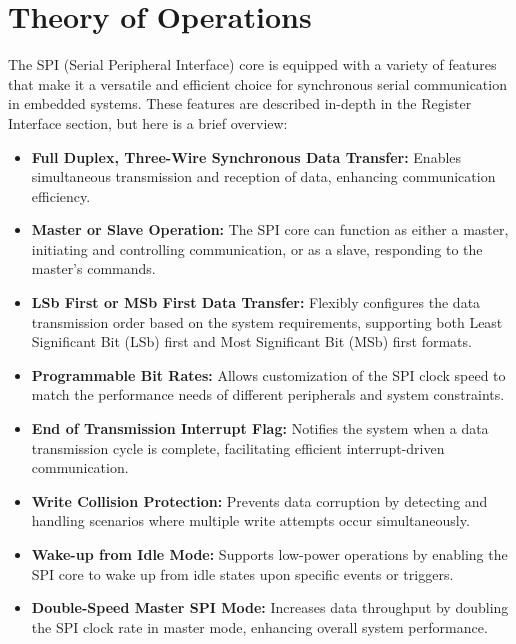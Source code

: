 \section{Theory of Operations}

The SPI (Serial Peripheral Interface) core is equipped with a variety of features that make it a versatile and efficient choice for synchronous serial communication in embedded systems. These features
are described in-depth in the Register Interface section, but here is a brief overview:

\begin{itemize}
    \item \textbf{Full Duplex, Three-Wire Synchronous Data Transfer:} Enables simultaneous transmission and reception of data, enhancing communication efficiency.
    \item \textbf{Master or Slave Operation:} The SPI core can function as either a master, initiating and controlling communication, or as a slave, responding to the master's commands.
    \item \textbf{LSb First or MSb First Data Transfer:} Flexibly configures the data transmission order based on the system requirements, supporting both Least Significant Bit (LSb) first and Most Significant Bit (MSb) first formats.
    \item \textbf{Programmable Bit Rates:} Allows customization of the SPI clock speed to match the performance needs of different peripherals and system constraints.
    \item \textbf{End of Transmission Interrupt Flag:} Notifies the system when a data transmission cycle is complete, facilitating efficient interrupt-driven communication.
    \item \textbf{Write Collision Protection:} Prevents data corruption by detecting and handling scenarios where multiple write attempts occur simultaneously.
    \item \textbf{Wake-up from Idle Mode:} Supports low-power operations by enabling the SPI core to wake up from idle states upon specific events or triggers.
    \item \textbf{Double-Speed Master SPI Mode:} Increases data throughput by doubling the SPI clock rate in master mode, enhancing overall system performance.
\end{itemize}

